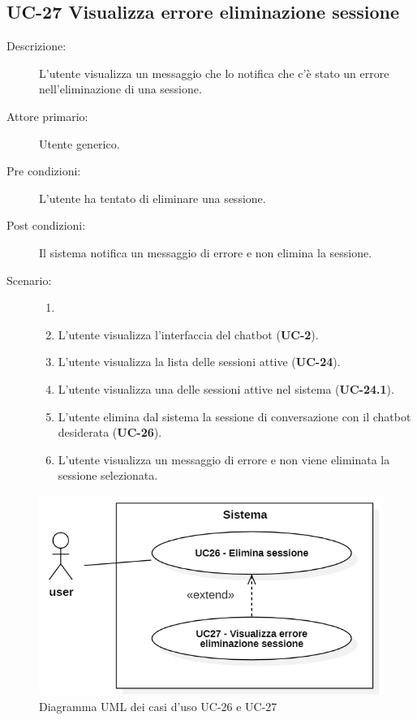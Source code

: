 \subsection{UC-27 Visualizza errore eliminazione sessione }
\begin{description}
    \item[Descrizione:] L'utente visualizza un messaggio che lo notifica che c'è stato un errore nell'eliminazione di una sessione.
    \item[Attore primario:] Utente generico.
    \item[Pre condizioni:] L'utente ha tentato di eliminare una sessione.
    \item[Post condizioni:] Il sistema notifica un messaggio di errore e non elimina la sessione.
    \item[Scenario:] \begin{enumerate}
        \item[] 
        \item L’utente visualizza l'interfaccia del chatbot (\textbf{UC-2}).
        \item L'utente visualizza la lista delle sessioni attive (\textbf{UC-24}).
        \item L'utente visualizza una delle sessioni attive nel sistema (\textbf{UC-24.1}).
        \item L'utente elimina dal sistema la sessione di conversazione con il chatbot desiderata (\textbf{UC-26}).
        \item L'utente visualizza un messaggio di errore e non viene eliminata la sessione selezionata.
    \end{enumerate}
\end{description}

\begin{figure}[H]
    \centering
    \includegraphics[width=0.9\linewidth]{UC26-27.PNG}
    \caption{Diagramma UML dei casi d'uso UC-26 e UC-27}
    \label{fig:UC26-27}
\end{figure}


